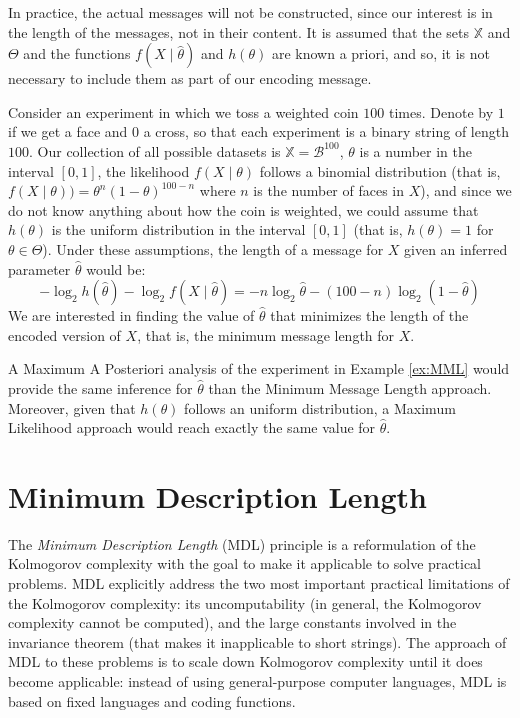 {\begin{definition}
\end{definition}

In practice, the actual messages will not be constructed, since our interest is in the length of the messages, not in their content. It is assumed that the sets $\mathbb{X}$ and $\Theta$ and the functions $f(X \mid \hat\theta)$ and $h(\theta)$ are known a priori, and so, it is not necessary to include them as part of our encoding message.

\begin{example}
\label{ex:MML}
Consider an experiment in which we toss a weighted coin $100$ times. Denote by $1$ if we get a face and $0$ a cross, so that each experiment is a binary string of length $100$. Our collection of all possible datasets is $\mathbb{X} = \mathcal{B}^{100}$, $\theta$ is a number in the interval $[0, 1]$, the likelihood $f (X \mid \theta)$ follows a binomial distribution (that is, $f (X \mid \theta) ) = \theta^n (1-\theta)^{100-n}$ where $n$ is the number of faces in $X$), and since we do not know anything about how the coin is weighted, we could assume that $h(\theta)$ is the uniform distribution in the interval $[0, 1]$ (that is, $h(\theta) = 1$ for $\theta \in \Theta$). Under these assumptions, the length of a message for $X$ given an inferred parameter $\hat\theta$ would be:
\[
- \log_2 h \left( \hat\theta \right) - \log_2 f \left( X \mid \hat\theta \right) = - n \log_2 \hat\theta - (100-n) \log_2 (1 - \hat\theta)
\]
We are interested in finding the value of $\hat\theta$ that minimizes the length of the encoded version of $X$, that is, the minimum message length for $X$.
\end{example}

A Maximum A Posteriori analysis of the experiment in Example \ref{ex:MML} would provide the same inference for $\hat\theta$ than the Minimum Message Length approach. Moreover, given that $h(\theta)$ follows an uniform distribution, a Maximum Likelihood approach would reach exactly the same value for $\hat\theta$.

%
%
\section{Minimum Description Length}
\label{sec:MDL}

The \emph{Minimum Description Length} (MDL) principle is a reformulation
of the Kolmogorov complexity with the goal to make it applicable to
solve practical problems. MDL explicitly address the two most important
practical limitations of the Kolmogorov complexity: its uncomputability
(in general, the Kolmogorov complexity cannot be computed), and the
large constants involved in the invariance theorem (that makes it
inapplicable to short strings). The approach of MDL to these problems
is to scale down Kolmogorov complexity until it does become applicable:
instead of using general-purpose computer languages, MDL is based
on fixed languages and coding functions.

}
